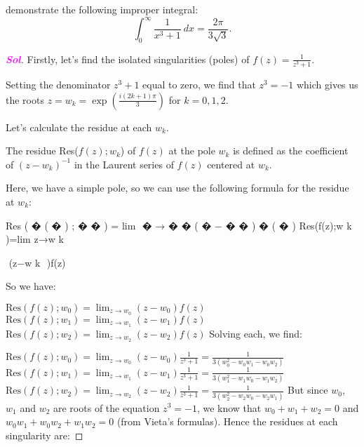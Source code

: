 \documentclass{article}
\theoremstyle{definition}
\newcommand{\sol}{\textcolor{magenta}{\bf Sol}}
\begin{document}
\begin{enumerate}[\bf 1.]
\begin{enumerate}
\begin{center}
		\end{center}
		demonstrate the following improper integral:\[
		\int_{0}^{\infty}\frac{1}{x^3+1}\ dx=\frac{2\pi}{3\sqrt{3}}.
		\]
	\end{enumerate}\begin{proof}[\sol]
		Firstly, let's find the isolated singularities (poles) of $f(z)=\frac{1}{z^3+1}$.
		
		Setting the denominator $z^3+1$ equal to zero, we find that $z^3 = -1$ which gives us the roots $z = w_k = \exp\left(\frac{i (2k + 1)\pi}{3}\right)$ for $k = 0, 1, 2$.
		
		Let's calculate the residue at each $w_k$.
		
		The residue Res($f(z); w_k$) of $f(z)$ at the pole $w_k$ is defined as the coefficient of $(z-w_k)^{-1}$ in the Laurent series of $f(z)$ centered at $w_k$.
		
		Here, we have a simple pole, so we can use the following formula for the residue at $w_k$:
		
		Res
		(
		�
		(
		�
		)
		;
		�
		�
		)
		=
		lim
		⁡
		�
		→
		�
		�
		(
		�
		−
		�
		�
		)
		�
		(
		�
		)
		Res(f(z);w 
		k
		​
		)=lim 
		z→w 
		k
		​
		
		​
		(z−w 
		k
		​
		)f(z)
		
		So we have:
		
		$\text{Res}(f(z); w_0) = \lim_{z\to w_0} (z - w_0) f(z)$
		$\text{Res}(f(z); w_1) = \lim_{z\to w_1} (z - w_1) f(z)$
		$\text{Res}(f(z); w_2) = \lim_{z\to w_2} (z - w_2) f(z)$
		Solving each, we find:
		
		$\text{Res}(f(z); w_0) = \lim_{z\to w_0} (z - w_0) \frac{1}{z^3+1} = \frac{1}{3(w_0^2 - w_0 w_1 - w_0 w_2)}$
		$\text{Res}(f(z); w_1) = \lim_{z\to w_1} (z - w_1) \frac{1}{z^3+1} = \frac{1}{3(w_1^2 - w_1 w_0 - w_1 w_2)}$
		$\text{Res}(f(z); w_2) = \lim_{z\to w_2} (z - w_2) \frac{1}{z^3+1} = \frac{1}{3(w_2^2 - w_2 w_0 - w_2 w_1)}$
		But since $w_0$, $w_1$ and $w_2$ are roots of the equation $z^3 = -1$, we know that $w_0 + w_1 + w_2 = 0$ and $w_0 w_1 + w_0 w_2 + w_1 w_2 = 0$ (from Vieta's formulas). Hence the residues at each singularity are:
		

\end{proof}
\end{enumerate}
\end{document}
